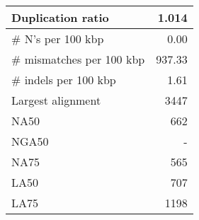 \documentclass[12pt,a4paper]{article}
\begin{document}
\begin{table}[ht]
\begin{center}
\begin{tabular}{|l*{1}{|r}|}
Duplication ratio & 1.014 \\ \hline
\# N's per 100 kbp & 0.00 \\ \hline
\# mismatches per 100 kbp & 937.33 \\ \hline
\# indels per 100 kbp & 1.61 \\ \hline
Largest alignment & 3447 \\ \hline
NA50 & 662 \\ \hline
NGA50 & - \\ \hline
NA75 & 565 \\ \hline
LA50 & 707 \\ \hline
LA75 & 1198 \\ \hline
\end{tabular}
\end{center}
\end{table}
\end{document}
